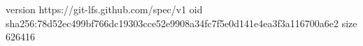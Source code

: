 version https://git-lfs.github.com/spec/v1
oid sha256:78d52ec499bf766dc19303cce52e9908a34fc7f5e0d141e4ea3f3a116700a6e2
size 626416
